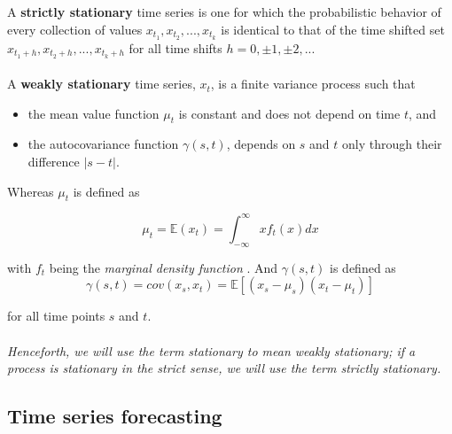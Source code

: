 \\
\\
A \textbf{strictly stationary} time series is one for which the probabilistic behavior of every collection of values
${x_{t_1}, x_{t_2}, ..., x_{t_k}}$
is identical to that of the time shifted set
${x_{t_1+h}, x_{t_2+h}, ..., x_{t_k+h}}$
for all time shifts $h=0,\pm1,\pm2,...$
\\
\\
A \textbf{weakly stationary} time series, $x_t$, is a finite variance process such that
\begin{itemize}
    \item the mean value function $\mu_t$ is constant and does not depend on time $t$, and
    \item the autocovariance function $\gamma(s, t)$, depends on $s$ and $t$ only through their difference $|s-t|$.
\end{itemize}

Whereas $\mu_t$ is defined as

\begin{equation}
    \mu_{t}=\mathbb{E}(x_t)=\int_{-\infty}^{\infty} x f_t(x) dx
\end{equation}

with $f_t$ being the \textit{marginal density function} \cite{shumway2000time}.
And $\gamma(s, t)$ is defined as
\begin{equation}
    \gamma(s, t)=cov(x_s, x_t)=\mathbb{E}[(x_s-\mu_s)(x_t-\mu_t)]
\end{equation}

for all time points $s$ and $t$.
\\
\\
\textit{Henceforth, we will use the term stationary to mean weakly stationary; if a process is stationary in the strict sense, we will use the term strictly stationary.}

\subsection{Time series forecasting}

